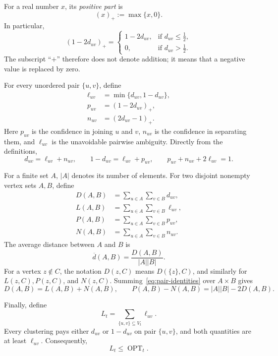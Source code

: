 \documentclass[11pt]{article}
\newcommand{\OPT}{\operatorname{OPT}}
\begin{document}
For a real number $x$, its \emph{positive part} is
\[
  (x)_+ := \max\{x,0\}.
\]
In particular,
\[
 (1-2d_{uv})_+
 =
 \begin{cases}
  1-2d_{uv},&\text{if }d_{uv}\le \tfrac12,\\
  0,&\text{if }d_{uv}>\tfrac12.
 \end{cases}
\]
The subscript ``$+$'' therefore does not denote addition; it means that a
negative value is replaced by zero.

For every unordered pair $\{u,v\}$, define
\begin{align*}
 \ell_{uv}&=\min\{d_{uv},1-d_{uv}\},\\
 p_{uv}&=(1-2d_{uv})_+,\\
 n_{uv}&=(2d_{uv}-1)_+.
\end{align*}
Here $p_{uv}$ is the confidence in joining $u$ and $v$, $n_{uv}$ is the
confidence in separating them, and $\ell_{uv}$ is the unavoidable
pairwise ambiguity.  Directly from the definitions,
\begin{equation}
 d_{uv}=\ell_{uv}+n_{uv},
 \qquad
 1-d_{uv}=\ell_{uv}+p_{uv},
 \qquad
 p_{uv}+n_{uv}+2\ell_{uv}=1.
 \label{eq:pair-identities}
\end{equation}

For a finite set $A$, $|A|$ denotes its number of elements.  For two
disjoint nonempty vertex sets $A,B$, define
\begin{align*}
 D(A,B)&=\sum_{u\in A}\sum_{v\in B}d_{uv},\\
 L(A,B)&=\sum_{u\in A}\sum_{v\in B}\ell_{uv},\\
 P(A,B)&=\sum_{u\in A}\sum_{v\in B}p_{uv},\\
 N(A,B)&=\sum_{u\in A}\sum_{v\in B}n_{uv}.
\end{align*}
The average distance between $A$ and $B$ is
\[
  \overline d(A,B)=\frac{D(A,B)}{|A||B|}.
\]
For a vertex $z\notin C$, the notation $D(z,C)$ means
$D(\{z\},C)$, and similarly for $L(z,C),P(z,C)$, and $N(z,C)$.
Summing~\eqref{eq:pair-identities} over $A\times B$ gives
\begin{equation}
 D(A,B)=L(A,B)+N(A,B),
 \qquad
 P(A,B)-N(A,B)=|A||B|-2D(A,B).
 \label{eq:set-identities}
\end{equation}

Finally, define
\[
 L_t=\sum_{\{u,v\}\subseteq V_t}\ell_{uv}.
\]
Every clustering pays either $d_{uv}$ or $1-d_{uv}$ on pair $\{u,v\}$,
and both quantities are at least $\ell_{uv}$.  Consequently,
\begin{equation}
  L_t\le \OPT_t.
  \label{eq:ambiguity-lower-bound}
\end{equation}
\end{document}
